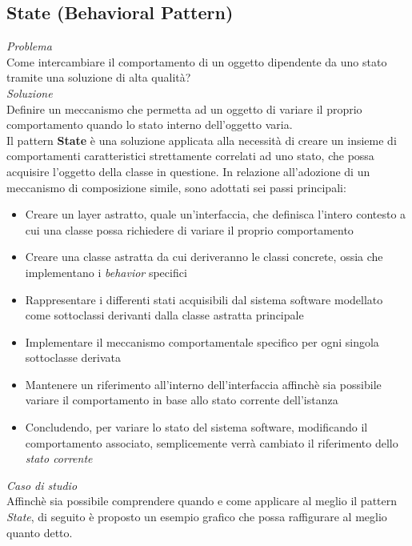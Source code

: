 \documentclass{article}
\begin{document}
\subsection*{State (Behavioral Pattern)}
\large
\textit{Problema}\\
Come intercambiare il comportamento di un oggetto dipendente da uno stato tramite una soluzione di alta qualità?\vspace*{14pt}\\
\textit{Soluzione}\\
Definire un meccanismo che permetta ad un oggetto di variare il proprio comportamento quando lo stato interno dell'oggetto varia.\vspace*{14pt}\\
Il pattern \textbf{State} è una soluzione applicata alla necessità di creare un insieme di comportamenti caratteristici strettamente correlati ad uno stato, che possa acquisire l'oggetto della classe in questione. In relazione all'adozione di un meccanismo di composizione simile, sono adottati sei passi principali:
\begin{itemize}[label={-}]
    \itemsep0em
    \item Creare un layer astratto, quale un'interfaccia, che definisca l'intero contesto a cui una classe possa richiedere di variare il proprio comportamento
    \item Creare una classe astratta da cui deriveranno le classi concrete, ossia che implementano i \textit{behavior} specifici
    \item Rappresentare i differenti stati acquisibili dal sistema software modellato come sottoclassi derivanti dalla classe astratta principale
    \item Implementare il meccanismo comportamentale specifico per ogni singola sottoclasse derivata
    \item Mantenere un riferimento all'interno dell'interfaccia affinchè sia possibile variare il comportamento in base allo stato corrente dell'istanza
    \item Concludendo, per variare lo stato del sistema software, modificando il comportamento associato, semplicemente verrà cambiato il riferimento dello \textit{stato corrente} 
\end{itemize}\vspace*{7pt}
\textit{Caso di studio}\\
Affinchè sia possibile comprendere quando e come applicare al meglio il pattern \textit{State}, di seguito è proposto un esempio grafico che possa raffigurare al meglio quanto detto.\vspace*{7pt}
\end{document}
